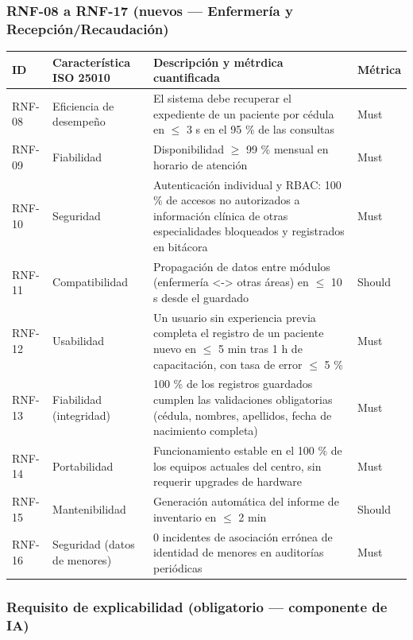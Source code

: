 \documentclass[11pt,a4paper]{article}
\begin{document}
	\subsubsection{ RNF-08 a RNF-17 (nuevos --- Enfermería y Recepción/Recaudación)}
	
	\begin{longtable}{p{}
			p{}
			p{}
			p{}}
		
		\toprule
		\textbf{ID} &
		\textbf{Característica ISO 25010} &
		\textbf{Descripción y métrdica cuantificada} &
		\textbf{Métrica}  \\
		\midrule
		\endhead
		
		RNF-08 & Eficiencia de desempeño & El sistema debe recuperar el expediente de un paciente por cédula en \(\leq\) 3 s en el 95 \% de las consultas & Must \\
		RNF-09 & Fiabilidad & Disponibilidad \(\geq\) 99 \% mensual en horario de atención & Must \\
		RNF-10 & Seguridad & Autenticación individual y RBAC: 100 \% de accesos no autorizados a información clínica de otras especialidades bloqueados y registrados en bitácora & Must \\
		RNF-11 & Compatibilidad & Propagación de datos entre módulos (enfermería <-> otras áreas) en \(\leq\) 10 s desde el guardado & Should \\
		RNF-12 & Usabilidad & Un usuario sin experiencia previa completa el registro de un paciente nuevo en \(\leq\) 5 min tras 1 h de capacitación, con tasa de error \(\leq\) 5 \% & Must \\
		RNF-13 & Fiabilidad (integridad) & 100 \% de los registros guardados cumplen las validaciones obligatorias (cédula, nombres, apellidos, fecha de nacimiento completa) & Must \\
		RNF-14 & Portabilidad & Funcionamiento estable en el 100 \% de los equipos actuales del centro, sin requerir upgrades de hardware & Must \\
		RNF-15 & Mantenibilidad & Generación automática del informe de inventario en \(\leq\) 2 min & Should \\
		RNF-16 & Seguridad (datos de menores) & 0 incidentes de asociación errónea de identidad de menores en auditorías periódicas & Must \\
		\bottomrule
		
	\end{longtable}
	
	\subsubsection{ Requisito de explicabilidad (obligatorio --- componente de IA)}
	
\end{document}

